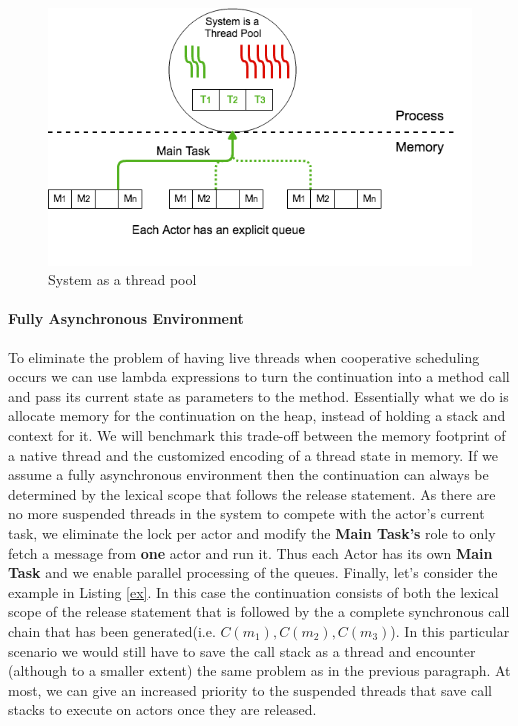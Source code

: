 \begin{figure}
	\label{stp}
	\centering
	\includegraphics[scale=0.5]{stp.png}
	\caption{System as a thread pool}
\end{figure}

\paragraph{Fully Asynchronous Environment}
To eliminate the problem of having live threads when cooperative scheduling occurs we can use lambda expressions to turn the continuation into a method call and pass its current state as parameters to the method. Essentially what we do is allocate memory for the continuation on the heap, instead of holding a stack and context for it. We will benchmark this trade-off between the memory footprint of a native thread and the customized encoding of a thread state in memory.  If we assume a fully asynchronous environment then the continuation can always be determined by the lexical scope that follows the release statement. As there are no more suspended threads in the system to compete with the actor's current task, we eliminate the lock per actor and modify the \textbf{Main Task's} role to only fetch a message from \textbf{one} actor and run it. Thus each Actor has its own \textbf{Main Task} and we enable parallel processing of the queues. Finally, let's consider the example in Listing \ref{ex}. In this case the continuation consists of both the lexical scope of the release statement that is followed by the a complete synchronous call chain that has been generated(i.e. $C(m_1), C(m_2), C(m_3)$). In this particular scenario we would still have to save the call stack as a thread and encounter (although to a smaller extent) the same problem as in the previous paragraph. At most, we can give an increased priority to the suspended threads that save call stacks to execute on actors once they are released.

